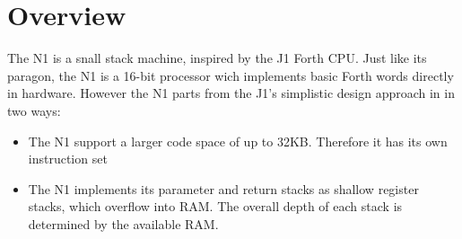 
\section{Overview}
\label{overview}

The N1 is a snall stack machine, inspired by the J1 Forth CPU\cite{j1}. 
Just like its paragon, the N1 is a 16-bit processor wich implements basic Forth words directly
in hardware. However the N1 parts from the J1's simplistic design approach in in two ways:

\begin{itemize}
  \item The N1 support a larger code space of up to 32KB. Therefore it has its own instruction set
  \item The N1 implements its parameter and return stacks as shallow register stacks, which overflow
        into RAM. The overall depth of each stack is determined by the available RAM. 
\end{itemize}


